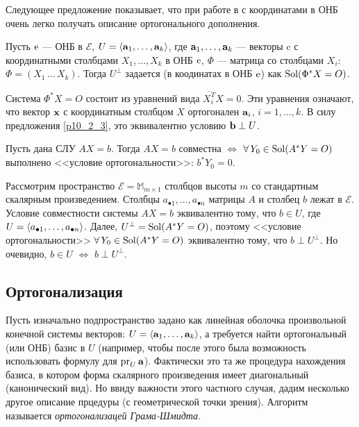 Следующее предложение показывает, что при работе в с координатами в ОНБ очень легко получать описание ортогонального дополнения.

\begin{predl}\label{10_2_5} 
Пусть $\mathrm{e}$ --- ОНБ в $\mathcal{E}$,
$U = \langle \mathbf{a}_1, \ldots, \mathbf{a}_k \rangle$, где $\mathbf{a}_1, \ldots, \mathbf{a}_k$ --- векторы c с координатными столбцами $X_1, \ldots, X_k$ в ОНБ $\mathrm{e}$,
$\Phi$ --- матрица со столбцами $X_i$: $\Phi = (X_1\, \ldots \, X_k)$.
Тогда $U^{\bot}$ задается (в коодинатах в ОНБ $\mathrm{e}$) как $\mathop{\rm Sol}\nolimits (\Phi^* X =O)$.
\end{predl}
\dok  Система $\Phi^* X =O$ состоит из уравнений вида $\overline{X_i^T}X = 0$. 
Эти уравнения означают, что вектор $\mathbf{x}$ с координатным столбцом $X$ ортогонален $\mathbf{a}_i$, $i=1, \ldots, k$.
В силу предложения \ref{p10_2_3}, это эквивалентно условию $\mathbf{b}\perp U$.
\edok



\begin{sled}
Пусть дана СЛУ $AX=b$. %
Тогда $AX=b$ совместна $\Leftrightarrow$ $\forall \, Y_0\in \mathop{\rm Sol}\nolimits(A^{*}Y=O)$ выполнено <<условие ортогональности>>: $b^{*}Y_0=0$.
\end{sled}
\dok 
Рассмотрим пространство $\mathcal{E}=\mathbb{M}_{m\times 1}$ столбцов высоты $m$ со стандартным скалярным произведением.
Столбцы $a_{\bullet 1}, \ldots, a_{\bullet n}$ матрицы $A$ и столбец $b$ лежат в $\mathcal{E}$.
Условие совместности системы $AX=b$ эквивалентно тому, что $b\in U$, где $U = \langle a_{\bullet 1}, \ldots, a_{\bullet n} \rangle$.
Далее, $U^{\bot} = \mathop{\rm Sol}\nolimits(A^{*}Y=O)$, поэтому <<условие ортогональности>>  $\forall \, Y_0\in \mathop{\rm Sol}\nolimits(A^{*}Y=O)$
эквивалентно тому, что $b\perp U^{\bot}$. Но очевидно, $b\in U$ $\Leftrightarrow$ $b\perp U^{\bot}$.
\edok


\subsection {Ортогонализация}

Пусть изначально подпространство задано как линейная оболочка произвольной конечной системы векторов: $U = \langle \mathbf{a}_1, \ldots, \mathbf{a}_k \rangle$,
а требуется найти ортогональный (или ОНБ) базис в $U$ (например, чтобы после этого была возможность использовать формулу для $\mathop{\rm pr}\nolimits_U \mathbf{a}$).
Фактически это та же процедура нахождения базиса, в котором форма скалярного произведения имеет диагональный 
(канонический вид).
Но ввиду важности этого частного случая, дадим несколько другое описание прцедуры (с геометрической точки зрения).
Алгоритм называется {\it ортогонализацей Грама-Шмидта}.

